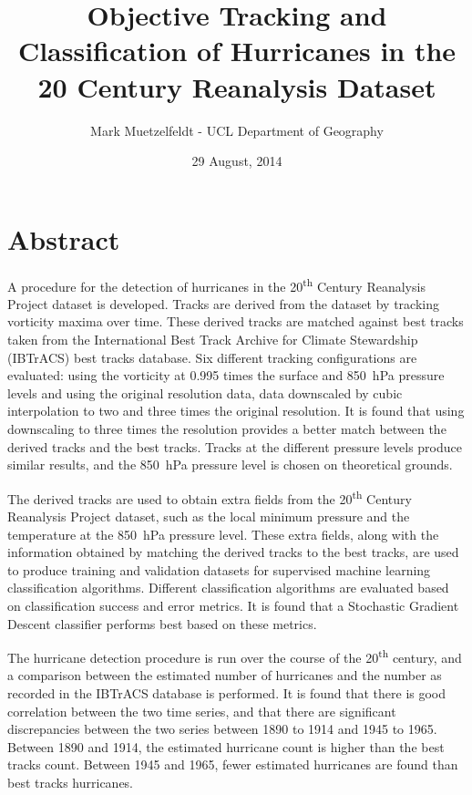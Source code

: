 \documentclass[pdftex,12pt,a4paper]{report}
\title{Objective Tracking and Classification of Hurricanes in the 20\ts{th} Century Reanalysis Dataset}
\author{Mark Muetzelfeldt - UCL Department of Geography}
\date{29 August, 2014}
\newcommand{\ts}{\textsuperscript}
\begin{document}


\clearpage
\thispagestyle{empty}
\null
\addtocounter{page}{-1}%
\newpage

\onehalfspacing
\section*{Abstract}

A procedure for the detection of hurricanes in the 20\ts{th} Century Reanalysis Project dataset is
developed. Tracks are derived from the dataset by tracking vorticity maxima over time. These derived
tracks are matched against best tracks taken from the International Best Track Archive for Climate
Stewardship (IBTrACS) best tracks database. Six different tracking configurations are evaluated:
using the vorticity at 0.995 times the surface and \SI{850}{hPa} pressure levels and using the
original resolution data, data downscaled by cubic interpolation to two and three times the original
resolution. It is found that using downscaling to three times the resolution provides a better match
between the derived tracks and the best tracks. Tracks at the different pressure levels produce
similar results, and the \SI{850}{hPa} pressure level is chosen on theoretical grounds.

The derived tracks are used to obtain extra fields from the 20\ts{th} Century Reanalysis
Project dataset, such as the local minimum pressure and the temperature at the \SI{850}{hPa}
pressure level. These extra fields, along with the information obtained by matching the derived
tracks to the best tracks, are used to produce training and validation datasets for supervised
machine learning classification algorithms. Different classification algorithms are evaluated based
on classification success and error metrics. It is found that a Stochastic Gradient Descent
classifier performs best based on these metrics.

The hurricane detection procedure is run over the course of the 20\ts{th} century, and a comparison
between the estimated number of hurricanes and the number as recorded in the IBTrACS database is
performed. It is found that there is good correlation between the two time series, and that there
are significant discrepancies between the two series between 1890 to 1914 and 1945 to 1965. Between
1890 and 1914, the estimated hurricane count is higher than the best tracks count. Between 1945 and
1965, fewer estimated hurricanes are found than best tracks hurricanes. 
\end{document}
